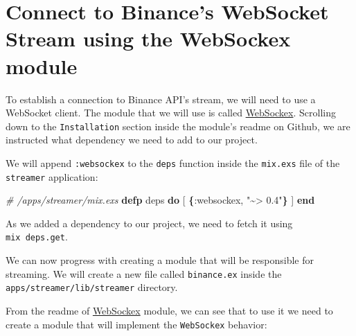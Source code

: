 \documentclass[
  oneside]{book}
\newenvironment{Shaded}{\begin{snugshade}}{\end{snugshade}}
\newcommand{\CommentTok}[1]{\textcolor[rgb]{0.56,0.35,0.01}{\textit{#1}}}
\newcommand{\FunctionTok}[1]{\textcolor[rgb]{0.13,0.29,0.53}{\textbf{#1}}}
\newcommand{\KeywordTok}[1]{\textcolor[rgb]{0.13,0.29,0.53}{\textbf{#1}}}
\newcommand{\NormalTok}[1]{#1}
\newcommand{\OtherTok}[1]{\textcolor[rgb]{0.56,0.35,0.01}{#1}}
\newcommand{\StringTok}[1]{\textcolor[rgb]{0.31,0.60,0.02}{#1}}
\newcommand{\VariableTok}[1]{\textcolor[rgb]{0.00,0.00,0.00}{#1}}
\begin{document}
\section{Connect to Binance's WebSocket Stream using the WebSockex module}\label{connect-to-binances-websocket-stream-using-the-websockex-module}

To establish a connection to Binance API's stream, we will need to use a WebSocket client. The module that we will use is called \href{https://github.com/Azolo/websockex}{WebSockex}. Scrolling down to the \texttt{Installation} section inside the module's readme on Github, we are instructed what dependency we need to add to our project.

We will append \texttt{:websockex} to the \texttt{deps} function inside the \texttt{mix.exs} file of the \texttt{streamer} application:

\begin{Shaded}
\begin{Highlighting}[]
  \CommentTok{\# /apps/streamer/mix.exs}
  \KeywordTok{defp}\NormalTok{ deps }\KeywordTok{do}
    \OtherTok{[}
      \FunctionTok{\{}\VariableTok{:websockex}\NormalTok{, }\StringTok{"\textasciitilde{}\textgreater{} 0.4"}\FunctionTok{\}}
    \OtherTok{]}
  \KeywordTok{end}
\end{Highlighting}
\end{Shaded}

As we added a dependency to our project, we need to fetch it using \texttt{mix\ deps.get}.

We can now progress with creating a module that will be responsible for streaming. We will create a new file called \texttt{binance.ex} inside the \texttt{apps/streamer/lib/streamer} directory.

From the readme of \href{https://github.com/Azolo/websockex}{WebSockex} module, we can see that to use it we need to create a module that will implement the \texttt{WebSockex} behavior:
\end{document}
